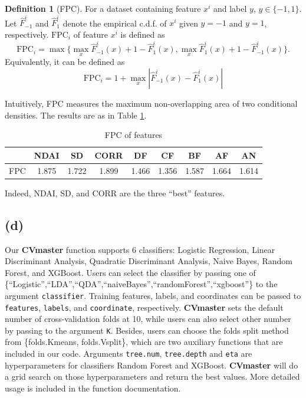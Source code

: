 \documentclass[11pt]{article}
\theoremstyle{definition}
\newtheorem{definition}{Definition}[section]
\begin{document}
\begin{definition}[FPC]

For a dataset containing feature $x^i$ and label $y$, $y \in \{-1,1\}$. Let $\hat{F}^i_{-1}$ and $\hat{F}^i_1$ denote the empirical c.d.f. of $x^i$ given $y=-1$ and $y=1$, respectively. $\text{FPC}_i$ of feature $x^i$ is defined as 
$$
\text{FPC}_i = \max\{ \max_x\hat{F}^i_{-1}(x)+1-\hat{F}^i_{1}(x),\max_x\hat{F}^i_{1}(x)+1-\hat{F}^i_{-1}(x) \}.
$$
Equivalently, it can be defined as
$$
\text{FPC}_i = 1 + \max_x |\hat{F}^i_{-1}(x)-\hat{F}^i_{1}(x)|
$$

\end{definition}

Intuitively, FPC measures the maximum non-overlapping area of two conditional densities. The results are as in Table \ref{tab6}.

\begin{table}[h]
    \centering
    \begin{tabular}{c||c|c|c|c|c|c|c|c}
     
    & NDAI
    & SD
    & CORR
    & DF
    & CF
    & BF
    & AF
    & AN \\
    \hline
    \hline
    FPC
    & 1.875
    & 1.722
    & 1.899
    & 1.466
    & 1.356
    & 1.587
    & 1.664
    & 1.614

    \end{tabular}
    \caption{FPC of features}
    \label{tab6}
\end{table}
\FloatBarrier

Indeed, NDAI, SD, and CORR are the three ``best'' features.

\subsection*{(d)}
Our \textbf{CVmaster} function supports 6 classifiers: Logistic Regression, Linear Discriminant Analysis, Quadratic Discriminant Analysis, Naive Bayes, Random Forest, and XGBoost. Users can select the classifier by passing one of \{``Logistic'',``LDA'',``QDA'',``naiveBayes'',``randomForest'',``xgboost''\} to the argument \texttt{classifier}. Training features, labels, and coordinates can be passed to \texttt{features}, \texttt{labels}, and \texttt{coordinate}, respectively. \textbf{CVmaster} sets the default number of cross-validation folds at 10, while users can also select other number by passing to the argument \texttt{K}. Besides, users can choose the folds split method from \{folds.Kmeans, folds.Vsplit\}, which are two auxiliary functions that are included in our code. Arguments \texttt{tree.num}, \texttt{tree.depth} and \texttt{eta} are hyperparameters for classifiers Random Forest and XGBoost. \textbf{CVmaster} will do a grid search on those hyperparameters and return the best values. More detailed usage is included in the function documentation.
\end{document}
